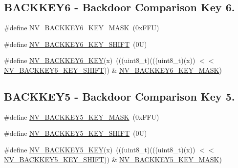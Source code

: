 \subsection*{B\+A\+C\+K\+K\+E\+Y6 -\/ Backdoor Comparison Key 6.}
\begin{DoxyCompactItemize}
\item 
\#define \mbox{\hyperlink{group___n_v___register___masks_ga44e2d846ef1b9d5ad94a707fa6f29ae1}{N\+V\+\_\+\+B\+A\+C\+K\+K\+E\+Y6\+\_\+\+K\+E\+Y\+\_\+\+M\+A\+SK}}~(0x\+F\+F\+U)
\item 
\#define \mbox{\hyperlink{group___n_v___register___masks_ga271a532af55987843f56d660efb5d440}{N\+V\+\_\+\+B\+A\+C\+K\+K\+E\+Y6\+\_\+\+K\+E\+Y\+\_\+\+S\+H\+I\+FT}}~(0\+U)
\item 
\#define \mbox{\hyperlink{group___n_v___register___masks_ga0dc772c12f13eb390c75b52f2110f0f1}{N\+V\+\_\+\+B\+A\+C\+K\+K\+E\+Y6\+\_\+\+K\+EY}}(x)~(((uint8\+\_\+t)(((uint8\+\_\+t)(x)) $<$$<$ \mbox{\hyperlink{group___n_v___register___masks_ga271a532af55987843f56d660efb5d440}{N\+V\+\_\+\+B\+A\+C\+K\+K\+E\+Y6\+\_\+\+K\+E\+Y\+\_\+\+S\+H\+I\+FT}})) \& \mbox{\hyperlink{group___n_v___register___masks_ga44e2d846ef1b9d5ad94a707fa6f29ae1}{N\+V\+\_\+\+B\+A\+C\+K\+K\+E\+Y6\+\_\+\+K\+E\+Y\+\_\+\+M\+A\+SK}})
\end{DoxyCompactItemize}
\subsection*{B\+A\+C\+K\+K\+E\+Y5 -\/ Backdoor Comparison Key 5.}
\begin{DoxyCompactItemize}
\item 
\#define \mbox{\hyperlink{group___n_v___register___masks_gab1e58bd037f31bcaa1b96a71340315ba}{N\+V\+\_\+\+B\+A\+C\+K\+K\+E\+Y5\+\_\+\+K\+E\+Y\+\_\+\+M\+A\+SK}}~(0x\+F\+F\+U)
\item 
\#define \mbox{\hyperlink{group___n_v___register___masks_ga68762e18611e6dfaed3ddfd7847c09f4}{N\+V\+\_\+\+B\+A\+C\+K\+K\+E\+Y5\+\_\+\+K\+E\+Y\+\_\+\+S\+H\+I\+FT}}~(0\+U)
\item 
\#define \mbox{\hyperlink{group___n_v___register___masks_ga07bc019ba659fc1b38053c8f191371b6}{N\+V\+\_\+\+B\+A\+C\+K\+K\+E\+Y5\+\_\+\+K\+EY}}(x)~(((uint8\+\_\+t)(((uint8\+\_\+t)(x)) $<$$<$ \mbox{\hyperlink{group___n_v___register___masks_ga68762e18611e6dfaed3ddfd7847c09f4}{N\+V\+\_\+\+B\+A\+C\+K\+K\+E\+Y5\+\_\+\+K\+E\+Y\+\_\+\+S\+H\+I\+FT}})) \& \mbox{\hyperlink{group___n_v___register___masks_gab1e58bd037f31bcaa1b96a71340315ba}{N\+V\+\_\+\+B\+A\+C\+K\+K\+E\+Y5\+\_\+\+K\+E\+Y\+\_\+\+M\+A\+SK}})
\end{DoxyCompactItemize}
